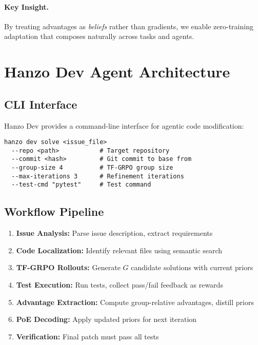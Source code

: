 \documentclass[11pt]{article}
\begin{document}
\paragraph{Key Insight.} By treating advantages as \emph{beliefs} rather than gradients, we enable zero-training adaptation that composes naturally across tasks and agents.





\section{Hanzo Dev Agent Architecture}
\subsection{CLI Interface}
Hanzo Dev provides a command-line interface for agentic code modification:
\begin{verbatim}
hanzo dev solve <issue_file>
  --repo <path>           # Target repository
  --commit <hash>         # Git commit to base from
  --group-size 4          # TF-GRPO group size
  --max-iterations 3      # Refinement iterations
  --test-cmd "pytest"     # Test command
\end{verbatim}

\subsection{Workflow Pipeline}
\begin{enumerate}
  \item \textbf{Issue Analysis:} Parse issue description, extract requirements
  \item \textbf{Code Localization:} Identify relevant files using semantic search
  \item \textbf{TF-GRPO Rollouts:} Generate \(G\) candidate solutions with current priors
  \item \textbf{Test Execution:} Run tests, collect pass/fail feedback as rewards
  \item \textbf{Advantage Extraction:} Compute group-relative advantages, distill priors
  \item \textbf{PoE Decoding:} Apply updated priors for next iteration
  \item \textbf{Verification:} Final patch must pass all tests
\end{enumerate}


\end{document}
